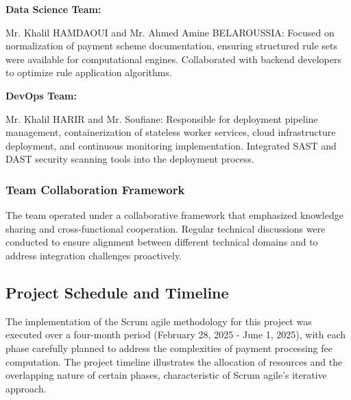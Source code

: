 \textbf{Data Science Team:}

Mr. Khalil HAMDAOUI and Mr. Ahmed Amine BELAROUSSIA: Focused on normalization of payment scheme documentation, ensuring structured rule sets were available for computational engines. Collaborated with backend developers to optimize rule application algorithms.

\textbf{DevOps Team:}

Mr. Khalil HARIR and Mr. Soufiane: Responsible for deployment pipeline management, containerization of stateless worker services, cloud infrastructure deployment, and continuous monitoring implementation. Integrated SAST and DAST security scanning tools into the deployment process.

\subsubsection{Team Collaboration Framework}

The team operated under a collaborative framework that emphasized knowledge sharing and cross-functional cooperation. Regular technical discussions were conducted to ensure alignment between different technical domains and to address integration challenges proactively.

\subsection{Project Schedule and Timeline}

The implementation of the Scrum agile methodology for this project was executed over a four-month period (February 28, 2025 - June 1, 2025), with each phase carefully planned to address the complexities of payment processing fee computation. The project timeline illustrates the allocation of resources and the overlapping nature of certain phases, characteristic of Scrum agile's iterative approach.

